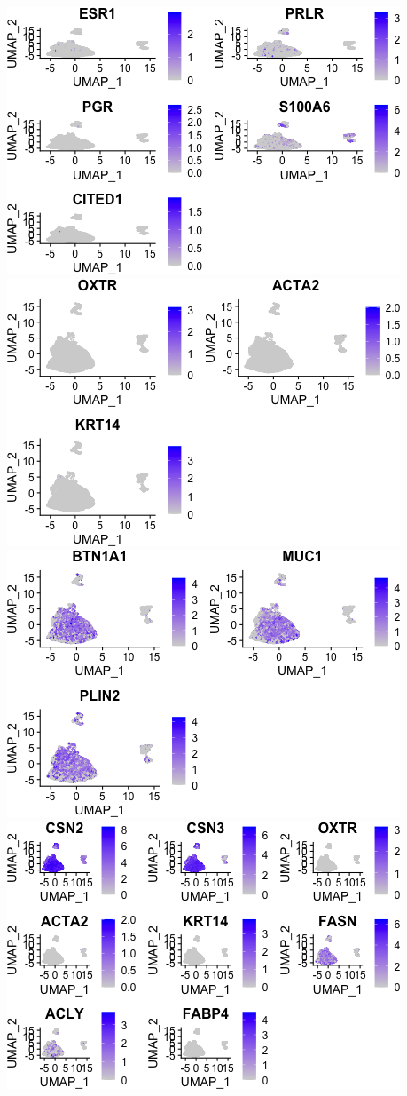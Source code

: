 \documentclass[]{article}
\begin{document}
\includegraphics{figures/feature-analysis-8.png}
\includegraphics{figures/feature-analysis-9.png}
\includegraphics{figures/feature-analysis-10.png}
\includegraphics{figures/feature-analysis-11.png}
\end{document}
